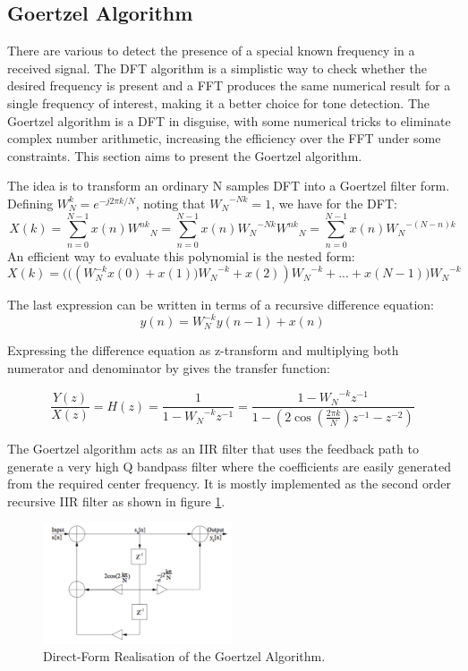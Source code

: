\documentclass[12pt,a4paper,openright]{article}
\begin{document}
\subsection{Goertzel Algorithm}

There are various to detect the presence of a special known frequency in a received signal. The DFT algorithm is a simplistic way to check whether the desired frequency is present and a FFT produces the same numerical result for a single frequency of interest, making it a better choice for tone detection. The Goertzel algorithm is a DFT in disguise, with some numerical tricks to eliminate complex number arithmetic, increasing the efficiency over the FFT under some constraints. This section aims to present the Goertzel algorithm.

The idea is to transform an ordinary N samples DFT into a Goertzel filter form. Defining $W_{N}^{k}={e^{ - j2\pi k/N}}$, noting that ${W_N}^{ - Nk} = 1$, we have for the DFT:
\[X(k) = \sum\limits_{n = 0}^{N - 1} {x(n){W^{nk}}_N}  = \sum\limits_{n = 0}^{N - 1} {x(n){W_N}^{ - Nk}{W^{nk}}_N}  = \sum\limits_{n = 0}^{N - 1} {x(n){W_N}^{ - (N - n)k}} \]
An efficient way to evaluate this polynomial is the nested form:
\[X(k)=\bigg(\big(({W^{ - k}_N}x(0) + x(1)\big){W_N}^{ - k} + x(2)){W_N}^{ - k} + ... + x(N - 1)\bigg){W_N}^{ - k}\]

The last expression can be written in terms of a recursive difference equation:
\[y(n) = {W^{ - k}_N}y(n - 1) + x(n)\]

Expressing the difference equation as z-transform and multiplying both numerator and denominator by gives the transfer function:

\[\frac{{Y(z)}}{{X(z)}} = H(z) = \frac{1}{{1 - {W_N}^{ - k}{z^{ - 1}}}} = \frac{{1 - {W_N}^{ - k}{z^{ - 1}}}}{{1 - (2\cos (\frac{{2\pi k}}{N}){z^{ - 1}} - {z^{ - 2}})}}\]

The Goertzel algorithm acts as an IIR filter that uses the feedback path to generate a very high Q bandpass filter where the coefficients are easily generated from the required center frequency.  It is mostly implemented as the second order recursive IIR filter as shown in figure \ref{IIR}. 
 \begin{figure}[h]
  \centering
    \includegraphics[width=0.5\textwidth]{IIR.pdf}
    \caption{Direct-Form Realisation of the Goertzel Algorithm.}
    \label{IIR}
\end{figure}
\end{document}
